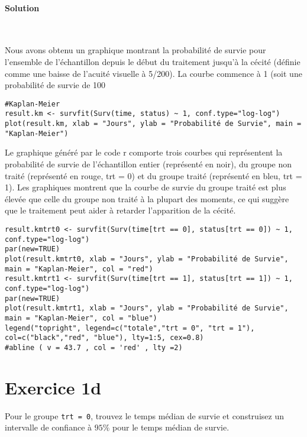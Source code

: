 \documentclass[../main.tex]{subfiles}
\begin{document}
\begin{CJK*}{UTF8}{gbsn}
\paragraph{Solution}\

Nous avons obtenu un graphique montrant la probabilité de survie pour l'ensemble de l'échantillon depuis le début du traitement jusqu'à la cécité (définie comme une baisse de l'acuité visuelle à 5/200). La courbe commence à 1 (soit une probabilité de survie de 100 %

\begin{lstlisting}
#Kaplan-Meier 
result.km <- survfit(Surv(time, status) ~ 1, conf.type="log-log")
plot(result.km, xlab = "Jours", ylab = "Probabilité de Survie", main = "Kaplan-Meier")

\end{lstlisting}


Le graphique généré par le code r comporte trois courbes qui représentent la probabilité de survie de l'échantillon entier (représenté en noir), du groupe non traité (représenté en rouge, trt = 0) et du groupe traité (représenté en bleu, trt = 1). Les graphiques montrent que la courbe de survie du groupe traité est plus élevée que celle du groupe non traité à la plupart des moments, ce qui suggère que le traitement peut aider à retarder l'apparition de la cécité.

\begin{lstlisting}
result.kmtrt0 <- survfit(Surv(time[trt == 0], status[trt == 0]) ~ 1, conf.type="log-log")
par(new=TRUE)
plot(result.kmtrt0, xlab = "Jours", ylab = "Probabilité de Survie", main = "Kaplan-Meier", col = "red")
result.kmtrt1 <- survfit(Surv(time[trt == 1], status[trt == 1]) ~ 1, conf.type="log-log")
par(new=TRUE)
plot(result.kmtrt1, xlab = "Jours", ylab = "Probabilité de Survie", main = "Kaplan-Meier", col = "blue")
legend("topright", legend=c("totale","trt = 0", "trt = 1"), col=c("black","red", "blue"), lty=1:5, cex=0.8)
#abline ( v = 43.7 , col = 'red' , lty =2)
\end{lstlisting}

\section*{Exercice 1d}
Pour le groupe \texttt{trt = 0}, trouvez le temps médian de survie et
construisez un intervalle de confiance à $95\%$ pour le temps médian de survie.


\end{CJK*}
\end{document}
